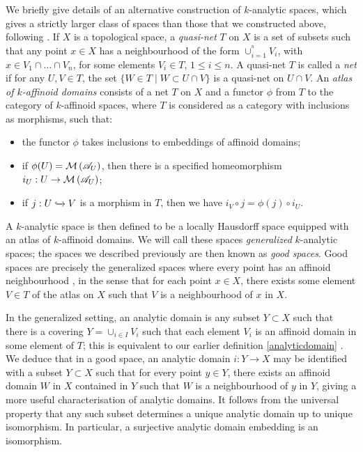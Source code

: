 We briefly give details of an alternative construction of $k$-analytic spaces, which gives a strictly larger class of spaces than those that we constructed above, following \parencite[\S 4.1]{temk}.
If $X$ is a topological space, a \textit{quasi-net} $T$ on $X$ is a set of subsets such that any point $x \in X$ has a neighbourhood of the form $\cup_{i = 1}^^n V_i$, with $x \in V_1 \cap \dots \cap V_n$, for some elements $V_i \in T$, $1 \leq i \leq n$.
A quasi-net $T$ is called a \textit{net} if for any $U, V \in T$, the set $\{ W \in T \;|\; W \subset U \cap V\}$ is a quasi-net on $U \cap V$.
An \textit{atlas of $k$-affinoid domains} consists of a net $T$ on $X$ and a functor $\phi$ from $T$ to the category of $k$-affinoid spaces, where $T$ is considered as a category with inclusions as morphisms, such that:
\begin{itemize}
    \item the functor $\phi$ takes inclusions to embeddings of affinoid domains;
    \item if $\phi(U) = \mathcal{M}\left(\mathscr{A}_U\right)$, then there is a specified homeomorphism $i_U: U \to \mathcal{M}\left(\mathscr{A}_U\right)$;
    \item if $j: U \xhookrightarrow{} V$ is a morphism in $T$, then we have $i_V \circ j = \phi(j) \circ i_U$.
\end{itemize}
A $k$-analytic space is then defined to be a locally Hausdorff space equipped with an atlas of $k$-affinoid domains.
We will call these spaces \textit{generalized} $k$-analytic spaces; the spaces we described previously are then known as \textit{good spaces}.
Good spaces are precisely the generalized spaces where every point has an affinoid neighbourhood \parencite[\S 4.2.1]{temk}, in the sense that for each point $x \in X$, there exists some element $V \in T$ of the atlas on $X$ such that $V$ is a neighbourhood of $x$ in $X$.

In the generalized setting, an analytic domain is any subset $Y \subset X$ such that there is a covering $Y = \cup_{i \in I} V_i$ such that each element $V_i$ is an affinoid domain in some element of $T$; this is equivalent to our earlier definition \cref{analyticdomain} \parencite[\S 1.3.1]{berk93}.
We deduce that in a good space, an analytic domain $i: Y \to X$ may be identified with a subset $Y \subset X$ such that for every point $y \in Y$, there exists an affinoid domain $W$ in $X$ contained in $Y$ such that $W$ is a neighbourhood of $y$ in $Y$, giving a more useful characterisation of analytic domains.
It follows from the universal property that any such subset determines a unique analytic domain up to unique isomorphism.
In particular, a surjective analytic domain embedding is an isomorphism.

